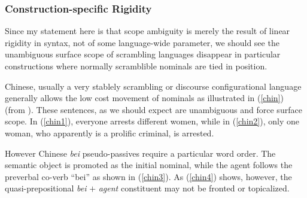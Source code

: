 \documentclass{article}
\begin{document}
\begin{exe}
\end{exe}


\subsubsection{Construction-specific Rigidity}

Since my statement here is that scope ambiguity is merely the result of linear rigidity in syntax, not of some language-wide parameter, we should see the unambiguous surface scope of scrambling languages disappear in particular constructions where normally scramblible nominals are tied in position.

Chinese, usually a very stablely scrambling or discourse configurational language generally allows the low cost movement of nominals as illustrated in (\ref{chin}) (from \textcite{aoun93}). These sentences, as we should expect are unambiguous and force surface scope. In (\ref{chin1}), everyone arrests different women, while in (\ref{chin2}), only one woman, who apparently is a prolific criminal, is arrested.

\begin{exe}
\ex \begin{xlist}\label{chin}
\end{xlist}
\end{exe}

However Chinese \emph{bei} pseudo-passives require a particular word order. The semantic object is promoted as the initial nominal, while the agent follows the preverbal co-verb ``bei'' as shown in (\ref{chin3}). As (\ref{chin4}) shows, however, the quasi-prepositional \emph{bei} $+$ \emph{agent} constituent may not be fronted or topicalized.
\end{document}
